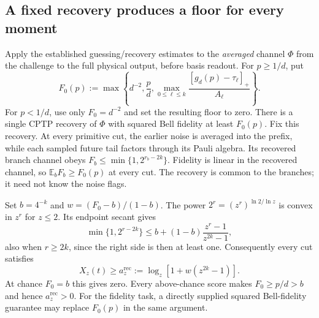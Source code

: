 \documentclass[11pt,a4paper]{article}
\numberwithin{equation}{section}
\theoremstyle{remark}\newtheorem*{remark}{Interpretation}
\newcommand{\E}{\mathbb E}
\begin{document}
\subsection{A fixed recovery produces a floor for every moment}
Apply the established guessing/recovery estimates to the \emph{averaged} channel $\Phi$ from the challenge to the full physical output, before basis readout. For $p\ge1/d$, put
\begin{equation}
F_0(p):=\max\left\{d^{-2},\frac pd,
\max_{0\le\ell\le k}
\frac{[g_d(p)-\tau_\ell]_+}{A_\ell}\right\}.
\label{eq:moment-recovery}
\end{equation}
For $p<1/d$, use only $F_0=d^{-2}$ and set the resulting floor to zero. There is a single CPTP recovery of $\Phi$ with squared Bell fidelity at least $F_0(p)$. Fix this recovery. At every primitive cut, the earlier noise is averaged into the prefix, while each sampled future tail factors through its Pauli algebra. Its recovered branch channel obeys
$F_b\le\min\{1,2^{r_b-2k}\}$. Fidelity is linear in the recovered channel, so $\E_bF_b\ge F_0(p)$ at every cut. The recovery is common to the branches; it need not know the noise flags.

Set $b=4^{-k}$ and $w=(F_0-b)/(1-b)$. The power $2^r=(z^r)^{\ln2/\ln z}$ is convex in $z^r$ for $z\le2$. Its endpoint secant gives
\[
\min\{1,2^{r-2k}\}
\le b+(1-b)\frac{z^r-1}{z^{2k}-1},
\]
also when $r\ge2k$, since the right side is then at least one. Consequently every cut satisfies
\begin{equation}
X_z(t)\ge a_z^{\mathrm{rec}}:=\log_z\!\left[1+w(z^{2k}-1)\right].
\label{eq:moment-floor}
\end{equation}
At chance $F_0=b$ this gives zero. Every above-chance score makes $F_0\ge p/d>b$ and hence $a_z^{\mathrm{rec}}>0$. For the fidelity task, a directly supplied squared Bell-fidelity guarantee may replace $F_0(p)$ in the same argument.
\end{document}
